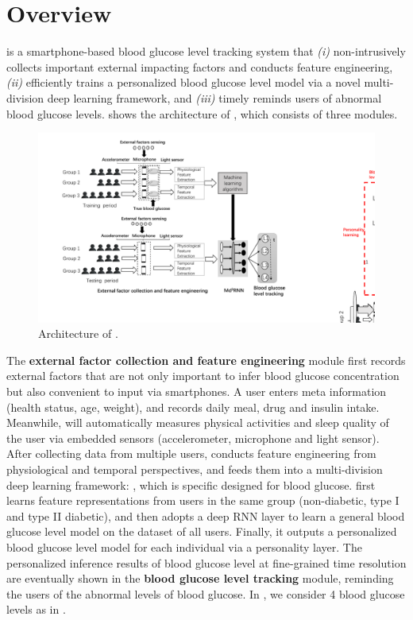 
\section{Overview}
\label{sec:overview}
\sysname is a smartphone-based blood glucose level tracking system that \emph{(i)} non-intrusively collects important external impacting factors and conducts feature engineering, \emph{(ii)} efficiently trains a personalized blood glucose level model via a novel multi-division deep learning framework, and \emph{(iii)} timely reminds users of abnormal blood glucose levels.
 shows the architecture of \sysname, which consists of three modules.

\begin{figure}[h]
  \centering
  \includegraphics[width=0.85\columnwidth]{./img/System_Arch2.pdf}
  \caption{Architecture of \sysname.}
  \label{fig:architecture}
\end{figure}


The \textbf{external factor collection and feature engineering} module first records external factors that are not only important to infer blood glucose concentration but also convenient to input via smartphones. A user enters meta information (\eg health status, age, weight), and records daily meal, drug and insulin intake.
Meanwhile, \sysname will automatically measures physical activities and sleep quality of the user via embedded sensors (\ie accelerometer, microphone and light sensor). After collecting data from multiple users, \sysname conducts feature engineering from physiological and temporal perspectives, and feeds them into a multi-division deep learning framework: \textbf{\modelname}, which is specific designed for blood glucose.
\modelname first learns feature representations from users in the same group (non-diabetic, type I and type II diabetic), and then adopts a deep RNN layer to learn a general blood glucose level model on the dataset of all users.
Finally, it outputs a personalized blood glucose level model for each individual via a personality layer. The personalized inference results of blood glucose level at fine-grained time resolution are eventually shown in the \textbf{blood glucose level tracking} module, reminding the users of the abnormal levels of blood glucose.
In \sysname, we consider 4 blood glucose levels as in .

